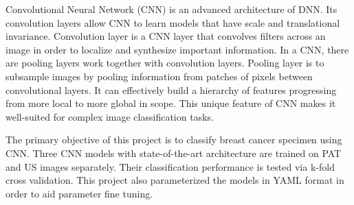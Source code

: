 Convolutional Neural Network (CNN)\citep{Krizhevsky2017} is an advanced architecture of DNN. Its convolution layers allow CNN to learn models that have scale and translational invariance. Convolution layer is a CNN layer that convolves filters across an image in order to localize and synthesize important information. In a CNN, there are pooling layers work together with convolution layers. Pooling layer is to subsample images by pooling information from patches of pixels between convolutional layers. It can effectively build a hierarchy of features progressing from more local to more global in scope. This unique feature of CNN makes it well-suited for complex image classification tasks.

The primary objective of this project is to classify breast cancer specimen using CNN. Three CNN models with state-of-the-art architecture are trained on PAT and US images separately. Their classification performance is tested via k-fold cross validation. This project also parameterized the models in YAML format in order to aid parameter fine tuning.






